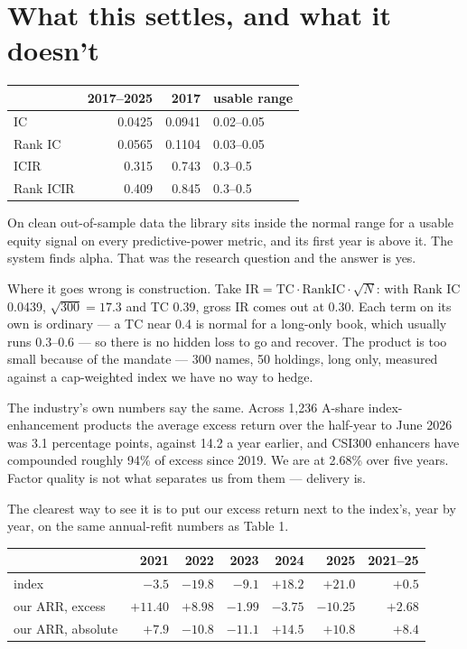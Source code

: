 \documentclass[11pt]{article}
\begin{document}
\section{What this settles, and what it doesn't}

\begin{table}[h]
\centering
\begin{tabular}{lrrl}
\toprule
& 2017--2025 & 2017 & usable range \\
\midrule
IC        & 0.0425 & 0.0941 & 0.02--0.05 \\
Rank IC   & 0.0565 & 0.1104 & 0.03--0.05 \\
ICIR      & 0.315  & 0.743  & 0.3--0.5 \\
Rank ICIR & 0.409  & 0.845  & 0.3--0.5 \\
\bottomrule
\end{tabular}
\end{table}

On clean out-of-sample data the library sits inside the normal range for a usable
equity signal on every predictive-power metric, and its first year is above it. The
system finds alpha. That was the research question and the answer is yes.

Where it goes wrong is construction. Take
$\mathrm{IR}=\mathrm{TC}\cdot\mathrm{RankIC}\cdot\sqrt{N}$: with Rank IC
0.0439, $\sqrt{300}=17.3$ and TC 0.39, gross IR comes out at 0.30. Each term on its
own is ordinary --- a TC near 0.4 is normal for a long-only book, which usually runs
0.3--0.6 --- so there is no hidden loss to go and recover. The product is too small
because of the mandate --- 300 names, 50 holdings, long only, measured against a
cap-weighted index we have no way to hedge.

The industry's own numbers say the same. Across 1,236 A-share index-enhancement products
the average excess return over the half-year to June 2026 was 3.1 percentage points,
against 14.2 a year earlier, and CSI300 enhancers have compounded roughly 94\% of excess
since 2019. We are at 2.68\% over five years. Factor quality is not what separates us
from them --- delivery is.

The clearest way to see it is to put our excess return next to the index's, year by
year, on the same annual-refit numbers as Table 1.

\begin{table}[h]
\centering
\small
\begin{tabular}{lrrrrrr}
\toprule
& 2021 & 2022 & 2023 & 2024 & 2025 & 2021--25 \\
\midrule
index             & $-3.5$ & $-19.8$ & $-9.1$ & $+18.2$ & $+21.0$ & $+0.5$ \\
our ARR, excess   & $\bm{+11.40}$ & $\bm{+8.98}$ & $-1.99$ & $-3.75$ & $-10.25$ & $\bm{+2.68}$ \\
our ARR, absolute & $+7.9$ & $-10.8$ & $-11.1$ & $+14.5$ & $+10.8$ & $+8.4$ \\
\bottomrule
\end{tabular}
\end{table}
\end{document}
